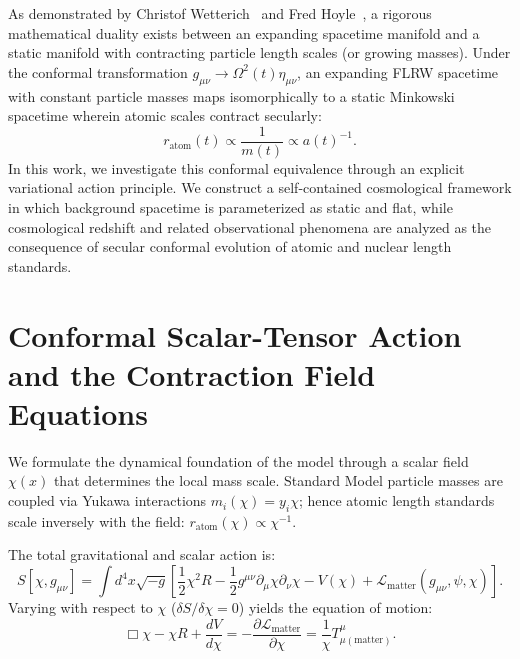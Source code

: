\documentclass[11pt,a4paper]{article}
\begin{document}
As demonstrated by Christof Wetterich~\cite{wetterich2013} and Fred Hoyle~\cite{hoyle1964}, a rigorous mathematical duality exists between an expanding spacetime manifold and a static manifold with contracting particle length scales (or growing masses). Under the conformal transformation $g_{\mu\nu} \to \Omega^2(t) \eta_{\mu\nu}$, an expanding FLRW spacetime with constant particle masses maps isomorphically to a static Minkowski spacetime wherein atomic scales contract secularly:
\begin{equation}
    r_{\mathrm{atom}}(t) \propto \frac{1}{m(t)} \propto a(t)^{-1}.
\end{equation}
In this work, we investigate this conformal equivalence through an explicit variational action principle. We construct a self-contained cosmological framework in which background spacetime is parameterized as static and flat, while cosmological redshift and related observational phenomena are analyzed as the consequence of secular conformal evolution of atomic and nuclear length standards.

\section{Conformal Scalar-Tensor Action and the Contraction Field Equations}
\label{sec:action_cosmo}

We formulate the dynamical foundation of the model through a scalar field $\chi(x)$ that determines the local mass scale. Standard Model particle masses are coupled via Yukawa interactions $m_i(\chi) = y_i \chi$; hence atomic length standards scale inversely with the field: $r_{\mathrm{atom}}(\chi) \propto \chi^{-1}$.

The total gravitational and scalar action is:
\begin{equation}
    S[\chi, g_{\mu\nu}] = \int d^4x \sqrt{-g} \left[ \frac{1}{2} \chi^2 R - \frac{1}{2} g^{\mu\nu} \partial_\mu \chi \partial_\nu \chi - V(\chi) + \mathcal{L}_{\mathrm{matter}}(g_{\mu\nu}, \psi, \chi) \right].
    \label{eq:conformal_action}
\end{equation}
Varying with respect to $\chi$ ($\delta S / \delta \chi = 0$) yields the equation of motion:
\begin{equation}
    \Box \chi - \chi R + \frac{dV}{d\chi} = -\frac{\partial \mathcal{L}_{\mathrm{matter}}}{\partial \chi} = \frac{1}{\chi} T^\mu_{\mu(\mathrm{matter})}.
    \label{eq:chi_motion}
\end{equation}
\end{document}
